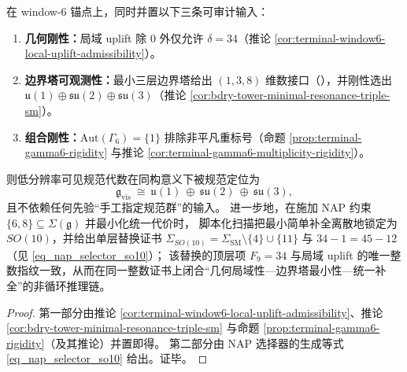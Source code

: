 \begin{corollary}\label{cor:window6-threefold-rigidity-closure-sm-so10}
在 window-\(6\) 锚点上，同时并置以下三条可审计输入：
\begin{enumerate}
  \item \textbf{几何刚性：}局域 uplift 除 \(0\) 外仅允许 \(\delta=34\)（推论 \ref{cor:terminal-window6-local-uplift-admissibility}）。
  \item \textbf{边界塔可观测性：}最小三层边界塔给出 \((1,3,8)\) 维数接口（\texttt{}），并刚性选出 \(\mathfrak u(1)\oplus\mathfrak{su}(2)\oplus\mathfrak{su}(3)\)（推论 \ref{cor:bdry-tower-minimal-resonance-triple-sm}）。
  \item \textbf{组合刚性：}\(\mathrm{Aut}(\Gamma_6)=\{1\}\) 排除非平凡重标号（命题 \ref{prop:terminal-gamma6-rigidity} 与推论 \ref{cor:terminal-gamma6-multiplicity-rigidity}）。
\end{enumerate}
则低分辨率可见规范代数在同构意义下被规范定位为
\[
\mathfrak g_{\mathrm{vis}}\ \cong\ \mathfrak u(1)\ \oplus\ \mathfrak{su}(2)\ \oplus\ \mathfrak{su}(3),
\]
且不依赖任何先验“手工指定规范群”的输入。
进一步地，在施加 NAP 约束 \(\{6,8\}\subseteq \Sigma(\mathfrak g)\) 并最小化统一代价时，
脚本化扫描把最小简单补全离散地锁定为 \(SO(10)\)，并给出单层替换证书
\(
\Sigma_{SO(10)}=\Sigma_{\mathrm{SM}}\setminus\{4\}\cup\{11\}
\)
与 \(34-1=45-12\)（见 \eqref{eq_nap_selector_so10}）；
该替换的顶层项 \(F_9=34\) 与局域 uplift 的唯一整数指纹一致，从而在同一整数证书上闭合“几何局域性—边界塔最小性—统一补全”的非循环推理链。
\end{corollary}
\begin{proof}
第一部分由推论 \ref{cor:terminal-window6-local-uplift-admissibility}、推论 \ref{cor:bdry-tower-minimal-resonance-triple-sm} 与命题 \ref{prop:terminal-gamma6-rigidity}（及其推论）并置即得。
第二部分由 NAP 选择器的生成等式 \eqref{eq_nap_selector_so10} 给出。证毕。
\end{proof}

